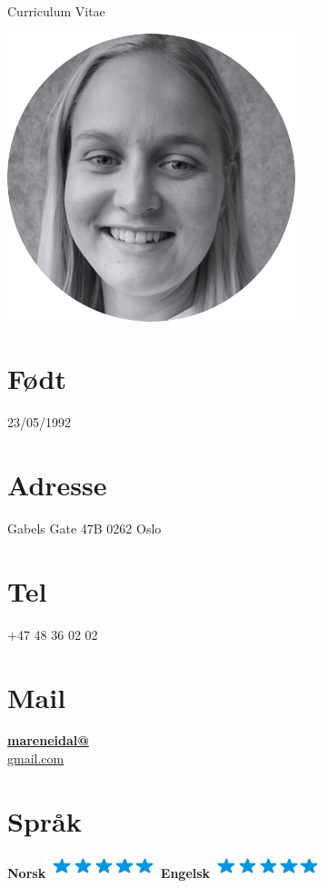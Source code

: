 \documentclass[]{friggeri-cv}
\begin{document}
      {Curriculum Vitae}
      

\begin{aside}
  \includegraphics[scale= 0.46, left]{img/circular_cv_photo.png}
  \section{Født}
    23/05/1992
    ~
  \section{Adresse}
    Gabels Gate 47B
    0262 Oslo
    ~
  \section{Tel}
    +47 48 36 02 02
    ~
  \section{Mail}
    \href{mailto:mareneidal@gmail.com}{\textbf{mareneidal@}\\gmail.com}
  \section{Språk}
    \textbf{Norsk}\includegraphics[scale=0.40]{img/5stars.png}
    \textbf{Engelsk}\includegraphics[scale=0.40]{img/5stars.png}
    ~

\end{aside}
\end{document}
